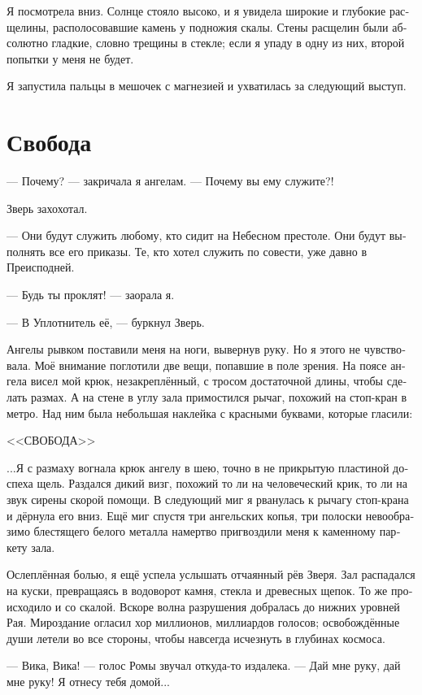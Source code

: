 \documentclass[a4paper,10pt,fleqn]{book}\usepackage{polyglossia}\setdefaultlanguage[babelshorthands=true]{russian}\setotherlanguage{english}\defaultfontfeatures{Ligatures=TeX,Mapping=tex-text}\usepackage{xcolor}\newcommand{\ml}[3]{#2}
\begin{document}
Я посмотрела вниз.
Солнце стояло высоко, и я увидела широкие и глубокие расщелины, располосовавшие камень у подножия скалы.
Стены расщелин были абсолютно гладкие, словно трещины в стекле;
если я упаду в одну из них, второй попытки у меня не будет.

Я запустила пальцы в мешочек с магнезией и ухватилась за следующий выступ.

\section{Свобода}

--- Почему? --- закричала я ангелам.
--- Почему вы ему служите?!

Зверь захохотал.

--- Они будут служить любому, кто сидит на Небесном престоле.
Они будут выполнять все его приказы.
Те, кто хотел служить по совести, уже давно в Преисподней.

--- Будь ты проклят! --- заорала я.

--- В Уплотнитель её, --- буркнул Зверь.

Ангелы рывком поставили меня на ноги, вывернув руку.
Но я этого не чувствовала.
Моё внимание поглотили две вещи, попавшие в поле зрения.
На поясе ангела висел мой крюк, незакреплённый, с тросом достаточной длины, чтобы сделать размах.
А на стене в углу зала примостился рычаг, похожий на стоп-кран в метро.
Над ним была небольшая наклейка с красными буквами, которые гласили:

<<СВОБОДА>>

...Я с размаху вогнала крюк ангелу в шею, точно в не прикрытую пластиной доспеха щель.
Раздался дикий визг, похожий то ли на человеческий крик, то ли на звук сирены скорой помощи.
В следующий миг я рванулась к рычагу стоп-крана и дёрнула его вниз.
Ещё миг спустя три ангельских копья, три полоски невообразимо блестящего белого металла намертво пригвоздили меня к каменному паркету зала.

Ослеплённая болью, я ещё успела услышать отчаянный рёв Зверя.
Зал распадался на куски, превращаясь в водоворот камня, стекла и древесных щепок.
То же происходило и со скалой.
Вскоре волна разрушения добралась до нижних уровней Рая.
Мироздание огласил хор миллионов, миллиардов голосов;
освобождённые души летели во все стороны, чтобы навсегда исчезнуть в глубинах космоса.

--- Вика, Вика! --- голос Ромы звучал откуда-то издалека.
--- Дай мне руку, дай мне руку! 
Я отнесу тебя домой...
\end{document}
